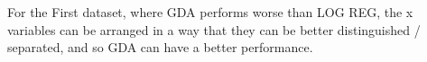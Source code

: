 \begin{answer}
For the First dataset, where GDA performs worse than LOG REG, the x variables can be arranged in a way that they can be better distinguished / separated, and so GDA can have a better performance.
\end{answer}